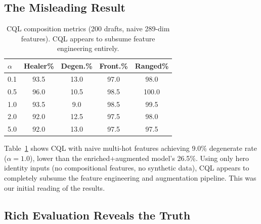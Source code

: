 \documentclass[journal]{IEEEtran}
\begin{document}
\subsection{The Misleading Result}

\begin{table}[t]
\centering
\caption{CQL composition metrics (200 drafts, naive 289-dim features). CQL appears to subsume feature engineering entirely.}
\label{tab:cql_basic}
\begin{tabular}{lcccc}
\toprule
$\alpha$ & Healer\% & Degen.\% & Front.\% & Ranged\% \\
\midrule
0.1 & 93.5 & 13.0 & 97.0 & 98.0 \\
0.5 & 96.0 & 10.5 & 98.5 & 100.0 \\
1.0 & 93.5 & 9.0 & 98.5 & 99.5 \\
2.0 & 92.0 & 12.5 & 97.5 & 98.0 \\
5.0 & 92.0 & 13.0 & 97.5 & 97.5 \\
\bottomrule
\end{tabular}
\end{table}

Table~\ref{tab:cql_basic} shows CQL with naive multi-hot features achieving 9.0\% degenerate rate ($\alpha = 1.0$), lower than the enriched+augmented model's 26.5\%. Using only hero identity inputs (no compositional features, no synthetic data), CQL appears to completely subsume the feature engineering and augmentation pipeline. This was our initial reading of the results.

\subsection{Rich Evaluation Reveals the Truth}
\end{document}
